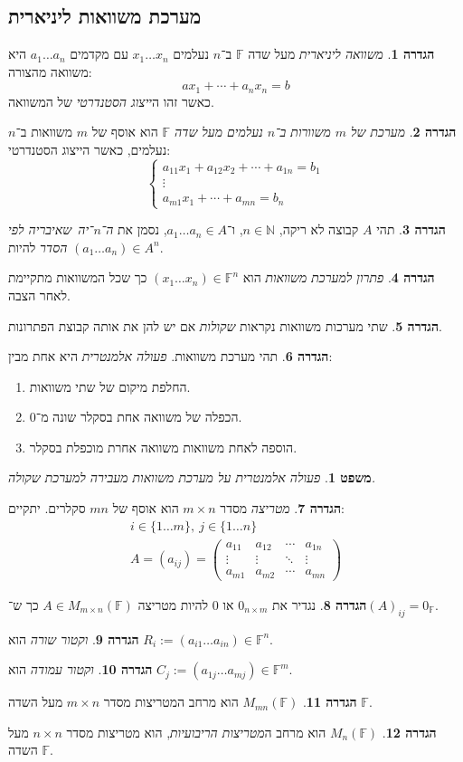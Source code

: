 \documentclass[]{article}
\newcommand\N     {\mathbb{N}}
\newcommand\n     {$n$־יה\ }
\newcommand\F         {\mathbb{F}}
\newcommand\pms[1]    {\begin{pmatrix}
		#1
\end{pmatrix}}
\newtheorem{Theorem}{משפט}
\theoremstyle{definition}
\newtheorem{definition}{הגדרה}
\newcommand\theo  [1] {\begin{Theorem}#1\end{Theorem}}
\newcommand\defi  [1] {\begin{definition}#1\end{definition}}
\begin{document}
\begin{multicols}{2}
		\section{מערכת משוואות ליניארית}
		\defi{\textit{משוואה ליניארית} מעל שדה $\F$ ב־$n$ נעלמים $x_1 \dots x_n$ עם מקדמים $a_1 \dots a_n$ היא משוואה מהצורה: 
		\[ ax_1 + \cdots + a_nx_n = b \]
		כאשר זהו ה\textit{ייצוג הסטנדרטי} של המשוואה. 
		}
		\defi{\textit{מערכת של $m$ משוורות ב־$n$ נעלמים מעל שדה $\F$} הוא אוסף של $m$ משוואות ב־$n$ נעלמים, כאשר הייצוג הסטנדרטי: 
		\[ \begin{cases}
			a_{11}x_1 + a_{12}x_2 + \cdots + a_{1n} = b_1 \\
			\vdots \\
			a_{m1}x_{1} + \cdots + a_{mn} = b_n
		\end{cases} \]}
		\defi{תהי $A$ קבוצה לא ריקה, $n \in \N$, ו־$a_1 \dots a_n \in A$, נסמן את \textit{ה־\n שאיבריה לפי הסדר} להיות $(a_1 \dots a_n) \in A^n$. }
		\defi{\textit{פתרון למערכת משוואות} הוא $(x_1 \dots x_n) \in \F^n$ כך שכל המשוואות מתקיימת לאחר הצבה. }
		\defi{שתי מערכות משוואות נקראות \textit{שקולות} אם יש להן את אותה קבוצת הפתרונות. }
		\defi{תהי מערכת משוואות. \textit{פעולה אלמנטרית} היא אחת מבין: 
		\begin{enumerate}
			\item החלפת מיקום של שתי משוואות. 
			\item הכפלה של משוואה אחת בסקלר שונה מ־0. 
			\item הוספה לאחת משוואות משוואה אחרת מוכפלת בסקלר. 
		\end{enumerate}
		}
		\theo{פעולה אלמנטרית על מערכת משוואות מעבירה למערכת שקולה. }
		\defi{\textit{מטריצה} מסדר $m \times n$ הוא אוסף של $mn$ סקלרים. יתקיים: 
		\begin{gather*}
			i \in \{1 \dots m\}, \ j \in \{1 \dots n\} \\ 
			A = (a_{ij}) = \pms{a_{11} & a_{12} & \cdots & a_{1n} \\ \vdots &\vdots & \ddots & \vdots \\ a_{m1} & a_{m2} & \cdots & a_{mn}}
		\end{gather*}}
		\defi{נגדיר את $0_{n \times m}$ או $0$ להיות מטריצה $A \in M_{m \times n}(\F)$ כך ש־$(A)_{ij} = 0_\F$. }
		\defi{\textit{וקטור שורה} הוא $R_i := (a_{i1} \dots a_{in}) \in \F^{n}$. }
		\defi{\textit{וקטור עמודה} הוא $C_j := (a_{1j} \dots a_{mj}) \in \F^{m}$. }
		\defi{$M_{mn}(\F)$ הוא מרחב המטריצות מסדר $m \times n$ מעל השדה $\F$. }
		\defi{$M_n(\F)$ הוא מרחב ה\textit{מטריצות הריבועיות}, הוא מטריצות מסדר $n \times n$ מעל השדה $\F$. }

\end{multicols}
\end{document}

